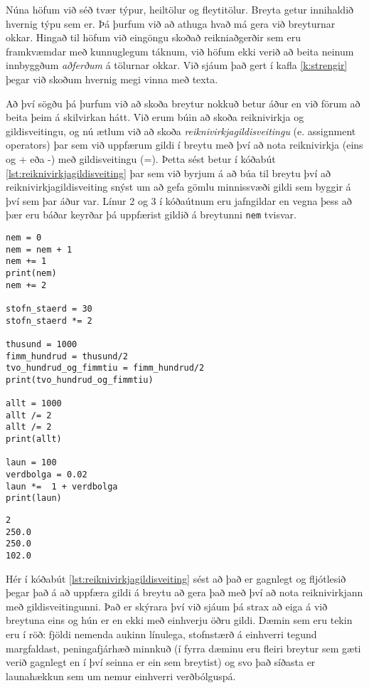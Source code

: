 Núna höfum við séð tvær týpur, heiltölur og fleytitölur.
Breyta getur innihaldið hvernig týpu sem er.
Þá þurfum við að athuga hvað má gera við breyturnar okkar.
Hingað til höfum við eingöngu skoðað reikniaðgerðir sem eru framkvæmdar með kunnuglegum táknum, við höfum ekki verið að beita neinum innbyggðum \textit{aðferðum} á tölurnar okkar.
Við sjáum það gert í kafla \ref{k:strengir} þegar við skoðum hvernig megi vinna með texta.

Að því sögðu þá þurfum við að skoða breytur nokkuð betur áður en við förum að beita þeim á skilvirkan hátt.
Við erum búin að skoða reiknivirkja og gildisveitingu, og nú ætlum við að skoða \textit{reiknivirkjagildisveitingu} (e. assignment operators) þar sem við uppfærum gildi í breytu með því að nota reiknivirkja (eins og + eða -) með gildisveitingu (=).
Þetta sést betur í kóðabút \ref{lst:reiknivirkjagildisveiting} þar sem við byrjum á að búa til breytu því að reiknivirkjagildisveiting snýst um að gefa gömlu minnissvæði gildi sem byggir á því sem þar áður var.
Línur 2 og 3 í kóðaútnum eru jafngildar en vegna þess að þær eru báðar keyrðar þá uppfærist gildið á breytunni \texttt{nem} tvisvar.

\begin{lstlisting}[caption="Reiknivirkjagildisveiting", label=lst:reiknivirkjagildisveiting]
nem = 0
nem = nem + 1
nem += 1
print(nem)
nem += 2

stofn_staerd = 30
stofn_staerd *= 2 

thusund = 1000
fimm_hundrud = thusund/2
tvo_hundrud_og_fimmtiu = fimm_hundrud/2
print(tvo_hundrud_og_fimmtiu)

allt = 1000
allt /= 2
allt /= 2
print(allt)

laun = 100
verdbolga = 0.02
laun *=  1 + verdbolga
print(laun)
\end{lstlisting}
\lstset{style=uttak}
\begin{lstlisting}
2
250.0
250.0
102.0
\end{lstlisting}
\lstset{style=venjulegt}

Hér í kóðabút \ref{lst:reiknivirkjagildisveiting} sést að það er gagnlegt og fljótlesið þegar það á að uppfæra gildi á breytu að gera það með því að nota reiknivirkjann með gildisveitingunni.
Það er skýrara því við sjáum þá strax að eiga á við breytuna eins og hún er en ekki með einhverju öðru gildi.
Dæmin sem eru tekin eru í röð: fjöldi nemenda aukinn línulega, stofnstærð á einhverri tegund margfaldast, peningafjárhæð minnkuð (í fyrra dæminu eru fleiri breytur sem gæti verið gagnlegt en í því seinna er ein sem breytist) og svo það síðasta er launahækkun sem um nemur einhverri verðbólguspá.

